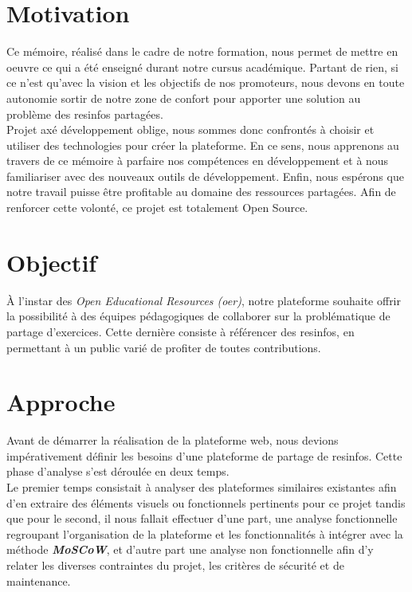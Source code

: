 \section*{Motivation}

Ce mémoire, réalisé dans le cadre de notre formation, nous permet de mettre en oeuvre ce qui a été enseigné durant notre cursus académique. Partant de rien, si ce n'est qu'avec la vision et les objectifs de nos promoteurs, nous devons en toute autonomie sortir de notre zone de confort pour apporter une solution au problème des \glspl{resinfo} partagées.\\

Projet axé développement oblige, nous sommes donc confrontés à choisir et utiliser des technologies pour créer la plateforme. En ce sens, nous apprenons au travers de ce mémoire à parfaire nos compétences en développement et à nous familiariser avec des nouveaux outils de développement.
Enfin, nous espérons que notre travail puisse être profitable au domaine des ressources partagées. Afin de renforcer cette volonté, ce projet est totalement Open Source.

\section*{Objectif}

À l’instar des \textit{Open Educational Resources (\Gls{oer})}, notre plateforme souhaite offrir la possibilité à des équipes pédagogiques de collaborer sur la problématique de partage d'exercices. Cette dernière consiste à référencer des \glspl{resinfo}, en permettant à un public varié de profiter de toutes contributions.\\

\section*{Approche}

Avant de démarrer la réalisation de la plateforme web, nous devions impérativement définir les besoins d'une plateforme de partage de \glspl{resinfo}. Cette phase d'analyse s'est déroulée en deux temps.\\

Le premier temps consistait à analyser des plateformes similaires existantes afin d'en extraire des éléments visuels ou fonctionnels pertinents pour ce projet tandis que pour le second, il nous fallait effectuer d'une part, une analyse fonctionnelle regroupant l'organisation de la plateforme et les fonctionnalités à intégrer avec la méthode \textit{\textbf{MoSCoW}}, et d'autre part une analyse non fonctionnelle afin d'y relater les diverses contraintes du projet, les critères de sécurité et de maintenance.\\

